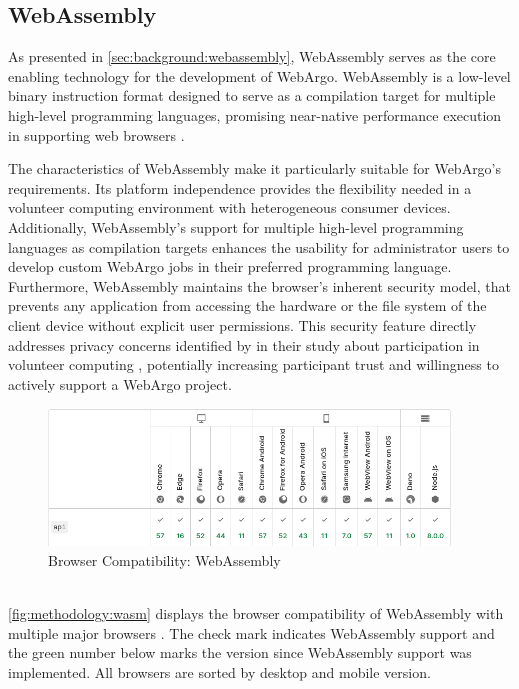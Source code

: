 \subsection{WebAssembly}
\label{sec:methodology:wasm}
As presented in \autoref{sec:background:webassembly}, WebAssembly serves as the core enabling technology for the development of WebArgo. WebAssembly is a low-level binary instruction format designed to serve as a compilation target for multiple high-level programming languages, promising near-native performance execution in supporting web browsers \cite{methodology:wasm, methodology:wasmW3C, methodology:wasm2}.

The characteristics of WebAssembly make it particularly suitable for WebArgo's requirements. Its platform independence provides the flexibility needed in a volunteer computing environment with heterogeneous consumer devices. Additionally, WebAssembly's support for multiple high-level programming languages as compilation targets enhances the usability for administrator users to develop custom WebArgo jobs in their preferred programming language. Furthermore, WebAssembly maintains the browser's inherent security model, that prevents any application from accessing the hardware or the file system of the client device without explicit user permissions. This security feature directly addresses privacy concerns identified by \citeauthor{intro:volunteerStudy} in their study about participation in volunteer computing \cite{intro:volunteerStudy}, potentially increasing participant trust and willingness to actively support a WebArgo project.

\begin{figure}[htbp]
  \centering
  \includegraphics[width=0.95\textwidth]{gfx/figures/webassembly-browsercompability.png}
  \caption{Browser Compatibility: WebAssembly \cite{methodology:wasmdocu}}
  \label{fig:methodology:wasm}
\end{figure}
~\\
\autoref{fig:methodology:wasm} displays the browser compatibility of WebAssembly with multiple major browsers \cite{methodology:wasmdocu}. The check mark indicates WebAssembly support and the green number below marks the version since WebAssembly support was implemented. All browsers are sorted by desktop and mobile version. 

